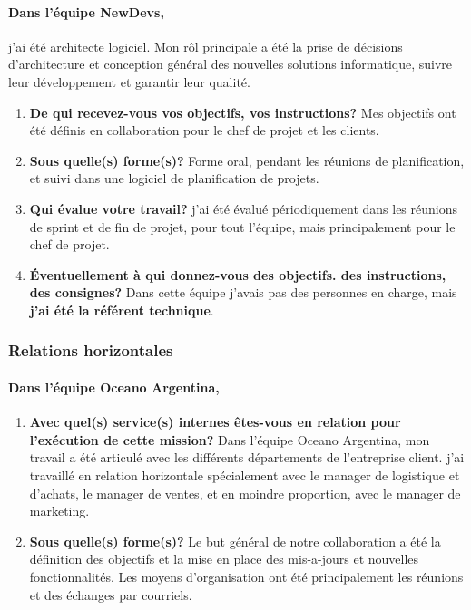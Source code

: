 \documentclass{resume} %
\begin{document}
		\paragraph{Dans l'équipe NewDevs,} j'ai été architecte logiciel. Mon rôl principale a été la  prise de décisions d'architecture et conception général des nouvelles solutions informatique, suivre leur développement et garantir leur qualité. 
		
		\begin{enumerate}
		\item \textbf{De qui recevez-vous vos objectifs, vos instructions?}
			Mes objectifs ont été définis en collaboration pour le chef de projet et les clients.
		\item \textbf{Sous quelle(s) forme(s)?}
			Forme oral, pendant les réunions de planification, et suivi dans une logiciel de planification de projets.
		\item \textbf{Qui évalue votre travail?}
			j'ai été évalué périodiquement dans les réunions de sprint et de fin de projet, pour tout l'équipe, mais principalement pour le chef de projet. 
		\item  \textbf{Éventuellement à qui donnez-vous des objectifs. des instructions, des consignes?}
			Dans cette équipe j'avais pas des  personnes en charge, mais \textbf{j'ai été la référent technique}.
		\end{enumerate}
		
					
	\subsubsection{Relations horizontales}
	
	
		\paragraph{Dans l'équipe Oceano Argentina,}
		
		\begin{enumerate}
		\item \textbf{Avec quel(s) service(s) internes êtes-vous en relation pour l'exécution de cette mission?}
			Dans l'équipe Oceano Argentina, mon travail a été articulé  avec  les différents départements de l'entreprise client. 
			j'ai travaillé en relation horizontale spécialement avec le manager de logistique et d'achats, 
			le manager de ventes, et en moindre proportion, avec le manager de marketing. 

		\item \textbf{Sous quelle(s) forme(s)?}
			Le but général de notre collaboration a été la définition des objectifs et la mise en place des mis-a-jours et nouvelles fonctionnalités. 
			Les moyens d'organisation ont été principalement les réunions et des échanges par courriels. 
		\end {enumerate}	
		
\end{document}
